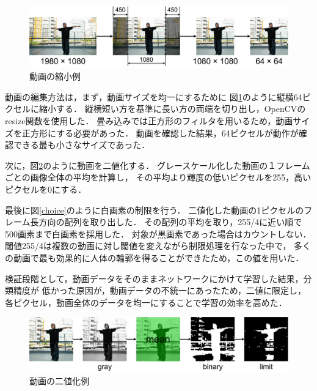 \begin{figure}[t]
  \begin{center}
    \includegraphics[width=120mm]{images/chart/resize.pdf}
  \end{center}
  \caption{動画の縮小例}
  \label{resize}
\end{figure}

動画の編集方法は，まず，動画サイズを均一にするために
図\ref{resize}のように縦横64ピクセルに縮小する．
縦横短い方を基準に長い方の両端を切り出し，OpenCVのresize関数\cite{resize}を使用した．
畳み込みでは正方形のフィルタを用いるため，動画サイズを正方形にする必要があった．
動画を確認した結果，64ピクセルが動作が確認できる最も小さなサイズであった．

次に，図\ref{binary}のように動画を二値化する．
グレースケール化した動画の１フレームごとの画像全体の平均を計算し，
その平均より輝度の低いピクセルを255，高いピクセルを0にする．

最後に図\ref{choice}のように白画素の制限を行う．
二値化した動画の1ピクセルのフレーム長方向の配列を取り出した．
その配列の平均を取り，255/4に近い順で500画素まで白画素を採用した．
対象が黒画素であった場合はカウントしない．
閾値255/4は複数の動画に対し閾値を変えながら制限処理を行なった中で，
多くの動画で最も効果的に人体の輪郭を得ることができたため，この値を用いた．

検証段階として，動画データをそのままネットワークにかけて学習した結果，分類精度が
低かった原因が，動画データの不統一にあったため，二値に限定し，
各ピクセル，動画全体のデータを均一にすることで学習の効率を高めた．

\begin{figure}[b]
  \begin{center}
    \includegraphics[width=120mm]{images/chart/binary.pdf}
  \end{center}
  \caption{動画の二値化例}
  \label{binary}
\end{figure}
\clearpage

